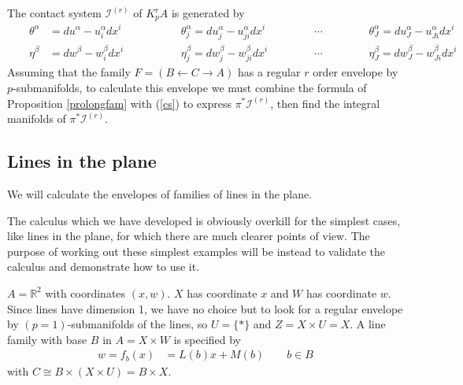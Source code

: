 \documentclass[12pt]{article}
\numberwithin{equation}{section}
\theoremstyle{plain}
\theoremstyle{definition}
\newcommand{\la}{\leftarrow}
\newcommand{\ra}{\rightarrow}
\begin{document}
The contact system $\mathcal{I}^{(r)}$ of $K^{r}_{p}A$ is generated by
\begin{equation}\label{cs}
\begin{aligned}
&&\theta^{\alpha}&=du^{\alpha}-u^{\alpha}_{i}dx^{i}&&\qquad &&\theta^{\alpha}_{j}=du^{\alpha}_{j}-u^{\alpha}_{ji}dx^{i}&& \quad&&\cdots&&\quad &&\theta^{\alpha}_{J}= du^{\alpha}_{J}-u^{\alpha}_{Ji}dx^{i}&&\\
&&\eta^{\beta}&=dw^{\beta}-w^{\beta}_{i}dx^{i}&&\qquad  &&\eta^{\beta}_{j}=dw^{\beta}_{j}-w^{\beta}_{ji}dx^{i}&& \quad&&\cdots&&\quad &&\eta^{\beta}_{J}=dw^{\beta}_{J}-w^{\beta}_{Ji}dx^{i}&&
\end{aligned}
\end{equation}
Assuming that the family $F=(B\la C\ra A)$ has a regular $r$ order envelope by $p$-submanifolds, to calculate this envelope we must combine the formula of Proposition \ref{prolongfam} with (\ref{cs}) to express $\pi^{*}\mathcal{I}^{(r)}$, then find the integral manifolds of $\pi^{*}\mathcal{I}^{(r)}$.

\subsection{Lines in the plane}\label{linesintheplane}

We will calculate the envelopes of families of lines in the plane.

The calculus which we have developed is obviously overkill for the simplest cases, like lines in the plane, for which there are much clearer points of view. The purpose of working out these simplest examples will be instead to validate the calculus and demonstrate how to use it.

\vspace{1pc}

$A=\mathbb{R}^{2}$ with coordinates $(x,w)$. $X$ has coordinate $x$ and $W$ has coordinate $w$. Since lines have dimension 1, we have no choice but to look for a regular envelope by $(p=1)$-submanifolds of the lines, so $U=\{*\}$ and $Z=X\times U=X$. A line family with base $B$ in $A=X\times W$ is specified by
\begin{align*}
w=f_b(x)&=L(b)x+M(b)\qquad b\in B
\end{align*}
with $C\cong B\times (X\times U)=B\times X$.
\end{document}
